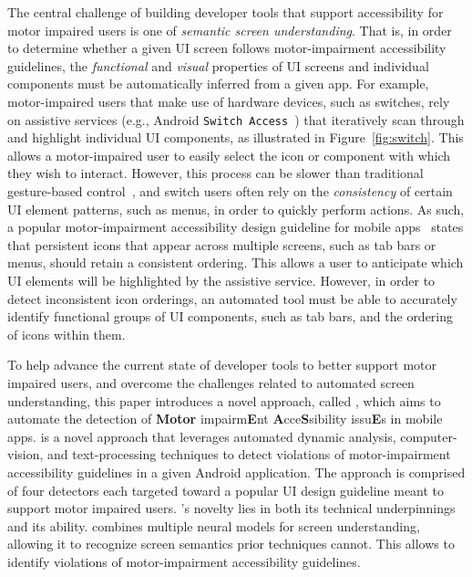 The central challenge of building developer tools that support accessibility for motor impaired users is one of \textit{semantic screen understanding}. That is, in order to determine whether a given UI screen follows motor-impairment accessibility guidelines, the \textit{functional} and \textit{visual} properties of UI screens and individual components must be automatically inferred from a given app. For example, motor-impaired users that make use of hardware devices, such as switches, rely on assistive services (e.g., Android \texttt{\small Switch Access}~\cite{switch-access}) that iteratively scan through and highlight individual UI components, as illustrated in Figure~\ref{fig:switch}. This allows a motor-impaired user to easily select the icon or component with which they wish to interact. However, this process can be slower than traditional gesture-based control~\cite{MacKenzie11}, and switch users often rely on the \textit{consistency} of certain UI element patterns, such as menus, in order to quickly perform actions. As such, a popular motor-impairment accessibility design guideline for mobile apps~\cite{AppleAccess,GoogleAccess} states that persistent icons that appear across multiple screens, such as tab bars or menus, should retain a consistent ordering. This allows a user to anticipate which UI elements will be highlighted by the assistive service. However, in order to detect inconsistent icon orderings, an automated tool must be able to accurately identify functional groups of UI components, such as tab bars, and the ordering of icons within them. 


To help advance the current state of developer tools to better support motor impaired users, and overcome the challenges related to automated screen understanding, this paper introduces a novel approach, called \MotorEase, which aims to automate the detection of \textbf{Motor} impairm\textbf{E}nt \textbf{A}cce\textbf{S}sibility issu\textbf{E}s in mobile apps. \MotorEase is a novel approach that leverages automated dynamic analysis, computer-vision, and text-processing techniques to detect violations of motor-impairment accessibility guidelines in a given Android application. The approach is comprised of four detectors each targeted toward a popular UI design guideline meant to support motor impaired users. \MotorEase's novelty lies in both its  technical underpinnings and its ability. \MotorEase combines multiple neural models for screen understanding, allowing it to recognize screen semantics prior techniques cannot. This allows \MotorEase to identify violations of motor-impairment accessibility guidelines. 

